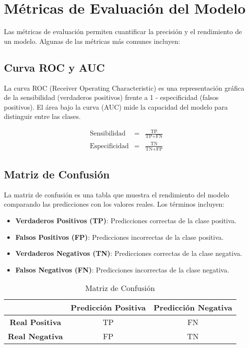 \documentclass[a4paper]{report} %
\begin{document}
\section{M\'etricas de Evaluaci\'on del Modelo}

Las m\'etricas de evaluaci\'on permiten cuantificar la precisi\'on y el rendimiento de un modelo. Algunas de las m\'etricas m\'as comunes incluyen:

\subsection{Curva ROC y AUC}

La curva ROC (Receiver Operating Characteristic) es una representaci\'on gr\'afica de la sensibilidad (verdaderos positivos) frente a 1 - especificidad (falsos positivos). El \'area bajo la curva (AUC) mide la capacidad del modelo para distinguir entre las clases.

\begin{eqnarray*}
\text{Sensibilidad} &=& \frac{\text{TP}}{\text{TP} + \text{FN}} \\
\text{Especificidad} &=& \frac{\text{TN}}{\text{TN} + \text{FP}}
\end{eqnarray*}

\subsection{Matriz de Confusi\'on}

La matriz de confusi\'on es una tabla que muestra el rendimiento del modelo comparando las predicciones con los valores reales. Los t\'erminos incluyen:
\begin{itemize}
    \item \textbf{Verdaderos Positivos (TP)}: Predicciones correctas de la clase positiva.
    \item \textbf{Falsos Positivos (FP)}: Predicciones incorrectas de la clase positiva.
    \item \textbf{Verdaderos Negativos (TN)}: Predicciones correctas de la clase negativa.
    \item \textbf{Falsos Negativos (FN)}: Predicciones incorrectas de la clase negativa.
\end{itemize}

\begin{table}[h]
\centering
\begin{tabular}{|c|c|c|}
\hline
 & \textbf{Predicci\'on Positiva} & \textbf{Predicci\'on Negativa} \\
\hline
\textbf{Real Positiva} & TP & FN \\
\hline
\textbf{Real Negativa} & FP & TN \\
\hline
\end{tabular}
\caption{Matriz de Confusi\'on}
\label{tab:confusion_matrix}
\end{table}
\end{document}

